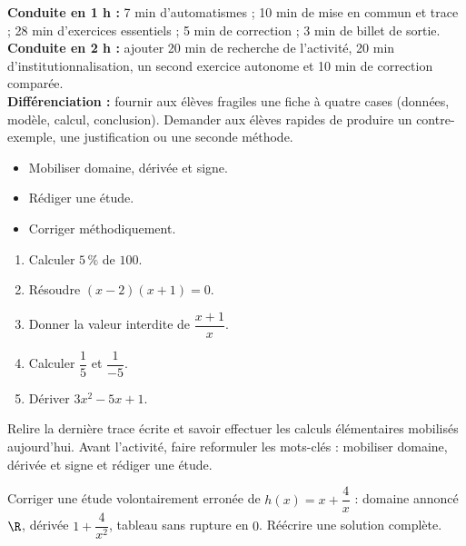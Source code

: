 \ifprof
\begin{methode}
\textbf{Conduite en 1 h :} 7 min d'automatismes ; 10 min de mise en commun et trace ; 28 min d'exercices essentiels ; 5 min de correction ; 3 min de billet de sortie.\\
\textbf{Conduite en 2 h :} ajouter 20 min de recherche de l'activité, 20 min d'institutionnalisation, un second exercice autonome et 10 min de correction comparée.\\
\textbf{Différenciation :} fournir aux élèves fragiles une fiche à quatre cases (données, modèle, calcul, conclusion). Demander aux élèves rapides de produire un contre-exemple, une justification ou une seconde méthode.
\end{methode}
\fi
{}
\begin{objectifs}\begin{itemize}\item Mobiliser domaine, dérivée et signe.\item Rédiger une étude.\item Corriger méthodiquement.\end{itemize}\end{objectifs}
\begin{automatismes}\begin{enumerate}\item Calculer $5\,\%$ de $100$. \item Résoudre $(x-2)(x+1)=0$. \item Donner la valeur interdite de $\dfrac{x+1}{x}$. \item Calculer $\dfrac1{5}$ et $\dfrac1{-5}$. \item Dériver $3x^2-5x+1$. \end{enumerate}\end{automatismes}
\begin{prerequis}Relire la dernière trace écrite et savoir effectuer les calculs élémentaires mobilisés aujourd'hui. Avant l'activité, faire reformuler les mots-clés : mobiliser domaine, dérivée et signe et rédiger une étude.\end{prerequis}

\begin{activite}
Corriger une étude volontairement erronée de $h(x)=x+\dfrac4x$ : domaine annoncé $\R$, dérivée $1+\dfrac4{x^2}$, tableau sans rupture en $0$. Réécrire une solution complète.

\end{activite}

